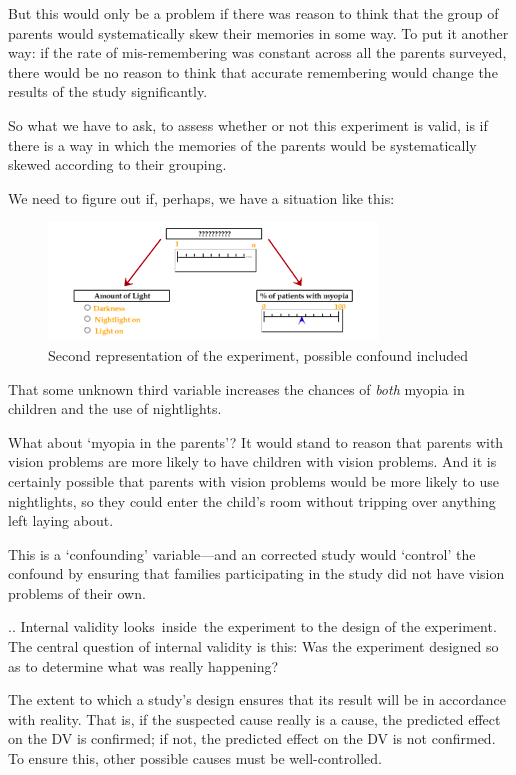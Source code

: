 \begin{refsection}
But this would only be a problem if there was reason to think that the group of parents would systematically skew their memories in some way. To put it another way: if the rate of mis-remembering was constant across all the parents surveyed, there would be no reason to think that accurate remembering would change the results of the study significantly.

So what we have to ask, to assess whether or not this experiment is valid, is if there is a way in which the memories of the parents would be systematically skewed according to their grouping. 

We need to figure out if, perhaps, we have a situation like this:

\begin{figure}\includegraphics{../images/hypothesis3.png}\caption{Second representation of the experiment, possible confound included}\label{fig:hypothesis1}\end{figure}

That some unknown third variable increases the chances of \emph{both} myopia in children and the use of nightlights.

What about `myopia in the parents'? It would stand to reason that parents with vision problems are more likely to have children with vision problems. And it is certainly possible that parents with vision problems would be more likely to use nightlights, so they could enter the child's room without tripping over anything left laying about.

This is a `confounding' variable---and an corrected study would `control' the confound by ensuring that families participating in the study did not have vision problems of their own.

.. Internal validity looks inside the experiment to the design of the experiment. The central question of internal validity is this: Was the experiment designed so as to determine what was really happening?
\begin{thesis}
The extent to which a study's design ensures that its result will be in accordance with reality. That is, if the suspected cause really is a cause, the predicted effect on the DV is confirmed; if not, the predicted effect on the DV is not confirmed. To ensure this, other possible causes must be well-controlled.
\end{thesis}


\end{refsection}
